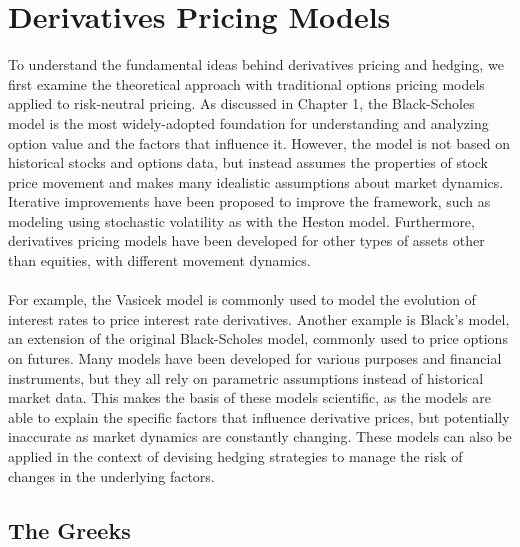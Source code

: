 \section{Derivatives Pricing Models}
To understand the fundamental ideas behind derivatives pricing and hedging, we first examine the theoretical approach with traditional options pricing models applied to risk-neutral pricing. As discussed in Chapter 1, the Black-Scholes model is the most widely-adopted foundation for understanding and analyzing option value and the factors that influence it. However, the model is not based on historical stocks and options data, but instead assumes the properties of stock price movement and makes many idealistic assumptions about market dynamics. Iterative improvements have been proposed to improve the framework, such as modeling using stochastic volatility as with the Heston model. Furthermore, derivatives pricing models have been developed for other types of assets other than equities, with different movement dynamics. 
\\ \\
For example, the Vasicek model is commonly used to model the evolution of interest rates to price interest rate derivatives. Another example is Black's model, an extension of the original Black-Scholes model, commonly used to price options on futures. Many models have been developed for various purposes and financial instruments, but they all rely on parametric assumptions instead of historical market data. This makes the basis of these models scientific, as the models are able to explain the specific factors that influence derivative prices, but potentially inaccurate as market dynamics are constantly changing. These models can also be applied in the context of devising hedging strategies to manage the risk of changes in the underlying factors.

\subsection{The Greeks}

